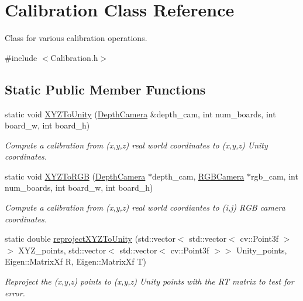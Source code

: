 \hypertarget{class_calibration}{}\section{Calibration Class Reference}
\label{class_calibration}


Class for various calibration operations.  




{\ttfamily \#include $<$Calibration.\+h$>$}

\subsection*{Static Public Member Functions}
\begin{DoxyCompactItemize}
\item 
static void \hyperlink{class_calibration_a81cb3c8c004042bfd86b6f973b607f67}{X\+Y\+Z\+To\+Unity} (\hyperlink{class_depth_camera}{Depth\+Camera} \&depth\+\_\+cam, int num\+\_\+boards, int board\+\_\+w, int board\+\_\+h)
\begin{DoxyCompactList}\small\item\em Compute a calibration from (x,y,z) real world coordinates to (x\textquotesingle{},y\textquotesingle{},z\textquotesingle{}) Unity coordinates. \end{DoxyCompactList}\item 
static void \hyperlink{class_calibration_ae686271805ffbaa32e0d8b796ae8d466}{X\+Y\+Z\+To\+R\+GB} (\hyperlink{class_depth_camera}{Depth\+Camera} $\ast$depth\+\_\+cam, \hyperlink{class_r_g_b_camera}{R\+G\+B\+Camera} $\ast$rgb\+\_\+cam, int num\+\_\+boards, int board\+\_\+w, int board\+\_\+h)
\begin{DoxyCompactList}\small\item\em Compute a calibration from (x,y,z) real world coordiantes to (i,j) R\+GB camera coordinates. \end{DoxyCompactList}\item 
static double \hyperlink{class_calibration_ac69c3f4ad6231d799e7b3d644acf1dcf}{reproject\+X\+Y\+Z\+To\+Unity} (std\+::vector$<$ std\+::vector$<$ cv\+::\+Point3f $>$$>$ X\+Y\+Z\+\_\+points, std\+::vector$<$ std\+::vector$<$ cv\+::\+Point3f $>$$>$ Unity\+\_\+points, Eigen\+::\+Matrix\+Xf R, Eigen\+::\+Matrix\+Xf T)
\begin{DoxyCompactList}\small\item\em Reproject the (x,y,z) points to (x\textquotesingle{},y\textquotesingle{},z\textquotesingle{}) Unity points with the RT matrix to test for error. \end{DoxyCompactList}\item 

\end{DoxyCompactItemize}
